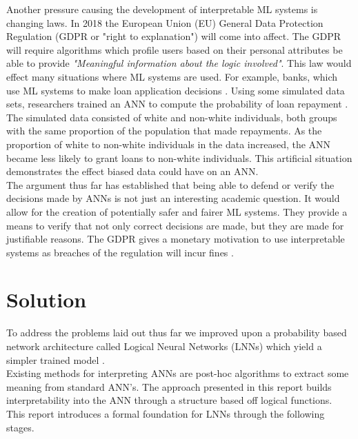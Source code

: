 Another pressure causing the development of interpretable ML systems is changing laws. In 2018 the European Union (EU) General Data Protection Regulation \cite{eu-dgpr} (GDPR or "right to explanation") will come into affect. The GDPR will require algorithms which profile users based on their personal attributes be able to provide \textit{"Meaningful information about the logic involved"}. This law would effect many situations where ML systems are used. For example, banks, which use ML systems to make loan application decisions \cite{goodman2016european}. Using some simulated data sets, researchers trained an ANN to compute the probability of loan repayment \cite{goodman2016european}. The simulated data consisted of white and non-white individuals, both groups with the same proportion of the population that made repayments. As the proportion of white to non-white individuals in the data increased, the ANN became less likely to grant loans to non-white individuals. This artificial situation demonstrates the effect biased data could have on an ANN.\\

The argument thus far has established that being able to defend or verify the decisions made by ANNs is not just an interesting academic question. It would allow for the creation of potentially safer and fairer ML systems. They provide a means to verify that not only correct decisions are made, but they are made for justifiable reasons. The GDPR gives a monetary motivation to use interpretable systems as breaches of the regulation will incur fines \cite{goodman2016european}.\\

\section{Solution}
To address the problems laid out thus far we improved upon a probability based network architecture called Logical Neural Networks (LNNs) which yield a simpler trained model \cite{LearningLogicalActivations}.\\

Existing methods for interpreting ANNs are post-hoc algorithms to extract some meaning from standard ANN's. The approach presented in this report builds interpretability into the ANN through a structure based off logical functions. This report introduces a formal foundation for LNNs through the following stages.

